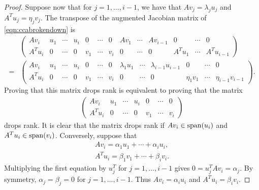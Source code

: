 \documentclass[12pt]{extarticle}
\theoremstyle{definition}
\numberwithin{theorem}{section}
\begin{document}
\begin{proof}
    Suppose now that for $j = 1, \ldots, i - 1$, we have that $Av_j = \lambda_j u_j$ and $A^T u_j = \eta_j v_j$. 
    The transpose of the augmented Jacobian matrix of \eqref{eqn:ccabrokendown} is 
    \begin{align*}
    &\left (
     \begin{array}{ccccccccccccccc}
            Av_i & u_1 & \cdots & u_i & 0 & \cdots & 0 & Av_1 & \cdots & Av_{i-1}& 0 & \cdots & 0\\
            A^Tu_i & 0 & \cdots & 0 & v_1 & \cdots & v_i & 0 & \cdots & 0 & A^Tu_1 & \cdots & A^Tu_{i-1}
        \end{array}
        \right)\\
        = &   \left (
     \begin{array}{ccccccccccccccc}
            Av_i & u_1 & \cdots & u_i & 0 & \cdots & 0 & \lambda_1 u_1 & \cdots & \lambda_{i-1}u_{i-1}& 0 & \cdots & 0\\
            A^Tu_i & 0 & \cdots & 0 & v_1 & \cdots & v_i & 0 & \cdots & 0 & \eta_1v_1 & \cdots & \eta_{i-1}v_{i-1}
        \end{array}
        \right).
     \end{align*}
    Proving that this matrix drops rank is equivalent to proving that the matrix
    \begin{align*}
         \begin{pmatrix}
            Av_i  & u_1 & \cdots & u_i & 0 & \cdots & 0\\
            A^T u_i & 0 & \cdots & 0 & v_1 & \cdots & v_i
            \end{pmatrix}
    \end{align*}
    drops rank. 
    It is clear that the matrix drops rank if $Av_i \in {\rm span}(u_i)$ and $A^Tu_i \in {\rm span}(v_i)$.
    Conversely, suppose that
    \begin{align*}
        Av_i = \alpha_1 u_1 + \cdots + \alpha_i u_i,\\
        A^T u_i = \beta_1 v_1 + \cdots + \beta_i v_i.
    \end{align*}
    Multiplying the first equation by $u_j^T$ for $j = 1, \ldots, i-1$ gives $0 = u_j^T A v_i = \alpha_j$. 
    By symmetry, $\alpha_j = \beta_j = 0$ for $j =1, \ldots, i-1$. 
    Thus $Av_i = \alpha_i u_i$ and $A^T u_i = \beta_i v_i$. 
\end{proof}
\end{document}
